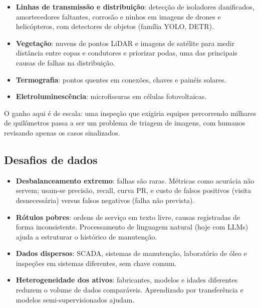 \documentclass[10pt,a4paper,oneside]{article}
\begin{document}
\begin{itemize}
  \item \textbf{Linhas de transmissão e distribuição}: detecção de isoladores
    danificados, amortecedores faltantes, corrosão e ninhos em imagens de
    drones e helicópteros, com detectores de objetos (família YOLO, DETR).
  \item \textbf{Vegetação}: nuvens de pontos LiDAR e imagens de satélite para
    medir distância entre copas e condutores e priorizar podas, uma das
    principais causas de falhas na distribuição.
  \item \textbf{Termografia}: pontos quentes em conexões, chaves e painéis
    solares.
  \item \textbf{Eletroluminescência}: microfissuras em células fotovoltaicas.
\end{itemize}
O ganho aqui é de escala: uma inspeção que exigiria equipes percorrendo
milhares de quilômetros passa a ser um problema de triagem de imagens, com
humanos revisando apenas os casos sinalizados.

\subsection{Desafios de dados}
\begin{itemize}
  \item \textbf{Desbalanceamento extremo}: falhas são raras. Métricas como
    acurácia não servem; usam-se precisão, recall, curva PR, e custo de falsos
    positivos (visita desnecessária) versus falsos negativos (falha não
    prevista).
  \item \textbf{Rótulos pobres}: ordens de serviço em texto livre, causas
    registradas de forma inconsistente. Processamento de linguagem natural
    (hoje com LLMs) ajuda a estruturar o histórico de manutenção.
  \item \textbf{Dados dispersos}: SCADA, sistemas de manutenção, laboratório de
    óleo e inspeções em sistemas diferentes, sem chave comum.
  \item \textbf{Heterogeneidade dos ativos}: fabricantes, modelos e idades
    diferentes reduzem o volume de dados comparáveis. Aprendizado por
    transferência e modelos semi-supervisionados ajudam.
\end{itemize}
\end{document}
